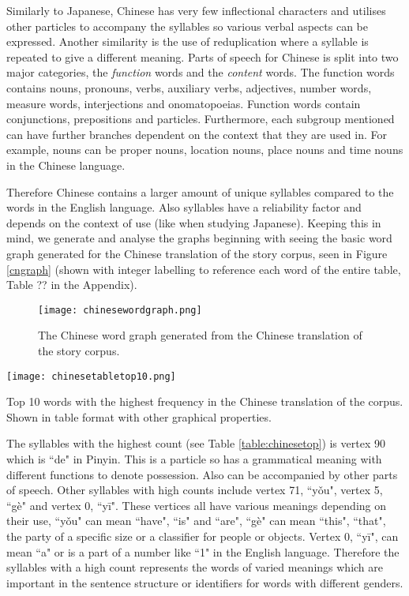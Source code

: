 Similarly to Japanese, Chinese has very few inflectional characters and utilises other particles to accompany the syllables so various verbal aspects can be expressed. Another similarity is the use of reduplication where a syllable is repeated to give a different meaning. Parts of speech for Chinese is split into two major categories, the \emph{function} words and the \emph{content} words. The function words contains nouns, pronouns, verbs, auxiliary verbs, adjectives, number words, measure words, interjections and onomatopoeias. Function words contain conjunctions, prepositions and particles. Furthermore, each subgroup mentioned can have further branches dependent on the context that they are used in. For example, nouns can be proper nouns, location nouns, place nouns and time nouns in the Chinese language.

Therefore Chinese contains a larger amount of unique syllables compared to the words in the English language. Also syllables have a reliability factor and depends on the context of use (like when studying Japanese). Keeping this in mind, we generate and analyse the graphs beginning with seeing the basic word graph generated for the Chinese translation of the story corpus, seen in Figure \ref{cngraph} (shown with integer labelling to reference each word of the entire table, Table ?? in the Appendix).

\begin{figure}[!htb]
\centering
\texttt{[image: chinesewordgraph.png]}
\caption{The Chinese word graph generated from the Chinese translation of the story corpus.}
\label{fig:cngraph}
\end{figure}

\begin{table}[!htb]
\centering
\texttt{[image: chinesetabletop10.png]}
\caption{Top 10 words with the highest frequency in the Chinese translation of the corpus. Shown in table format with other graphical properties. }
\label{table:chinesetop}
\end{table}

The syllables with the highest count (see Table \ref{table:chinesetop}) is vertex 90 which is ``de" in Pinyin. This is a particle so has a grammatical meaning with different functions to denote possession. Also can be accompanied by other parts of speech. Other syllables with high counts include vertex 71, ``yǒu", vertex 5, ``gè" and vertex 0, ``yī". These vertices all have various meanings depending on their use, ``yǒu" can mean ``have", ``is" and ``are", ``gè" can mean ``this", ``that", the party of a specific size or a classifier for people or objects. Vertex 0, ``yī", can mean ``a" or is a part of a number like ``1" in the English language. Therefore the syllables with a high count represents the words of varied meanings which are important in the sentence structure or identifiers for words with different genders.

